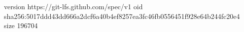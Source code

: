 version https://git-lfs.github.com/spec/v1
oid sha256:5017ddd43dd666a2dcf6a40b4ef8257ea3fc46fb0556451f928e64b244fc20e4
size 196704
